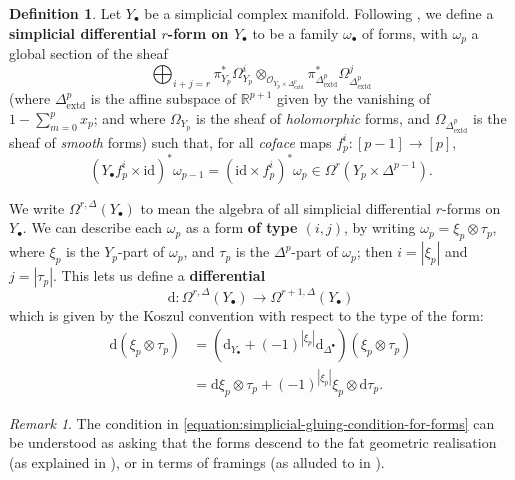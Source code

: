 \documentclass[11pt,fleqn]{article}
\theoremstyle{plain}
\theoremstyle{definition}
\newtheorem{definition}[theorem]{Definition}
\theoremstyle{remark}
\newtheorem{remark}[theorem]{Remark}
\numberwithin{equation}{theorem}
\newcommand{\OO}{\mathcal{O}}
\newcommand{\id}{\mathrm{id}}
\newcommand{\define}[1]{\textbf{#1}}
\renewcommand{\d}{\mathrm{d}}
\begin{document}
        \begin{definition}
            Let $Y_\bullet$ be a simplicial complex manifold.
            Following \cite{Dupont1976}, we define a \define{simplicial differential $r$-form on $Y_{\bullet}$} to be a family $\omega_\bullet$ of forms, with $\omega_p$ a global section of the sheaf
            \[
                \bigoplus_{i+j=r}
                    \pi_{Y_p}^* \Omega_{Y_p}^i
                    \otimes_{\OO_{Y_p\times \Delta^p_\mathrm{extd}}}
                    \pi_{\Delta^p_\mathrm{extd}}^* \Omega_{\Delta^p_\mathrm{extd}}^j
            \]
            (where $\Delta^p_\mathrm{extd}$ is the affine subspace of $\mathbb{R}^{p+1}$ given by the vanishing of $1-\sum_{m=0}^p x_p$; and where $\Omega_{Y_p}$ is the sheaf of \emph{holomorphic} forms, and $\Omega_{\Delta^p_\mathrm{extd}}$ is the sheaf of \emph{smooth} forms) such that, for all \emph{coface} maps $f_p^i\colon[p-1]\to[p]$,
            \begin{equation}
            \label{equation:simplicial-gluing-condition-for-forms}
                \left(Y_\bullet f_p^i\times\id\right)^*\omega_{p-1}
                = \left(\id\times f_p^i\right)^*\omega_p
                \in \Omega^r(Y_{p}\times\Delta^{p-1}).
            \end{equation}

            We write $\Omega^{r,\Delta}(Y_\bullet)$ to mean the algebra of all simplicial differential $r$-forms on $Y_\bullet$.
            We can describe each $\omega_p$ as a form \define{of type $(i,j)$}, by writing $\omega_p = \xi_p\otimes\tau_p$, where $\xi_p$ is the $Y_p$-part of $\omega_p$, and $\tau_p$ is the $\Delta^p$-part of $\omega_p$; then $i=|\xi_p|$ and $j=|\tau_p|$.
            This lets us define a \define{differential}
            \[
                \d \colon \Omega^{r,\Delta}(Y_\bullet) \longrightarrow \Omega^{r+1,\Delta}(Y_\bullet)
            \]
            which is given by the Koszul convention with respect to the type of the form:
            \begin{align*}
                \d(\xi_p\otimes\tau_p)
                &= \left(\d_{Y_\bullet} + (-1)^{|\xi_p|}\d_{\Delta^\bullet}\right) (\xi_p\otimes\tau_p)
            \\  &= \d\xi_p\otimes\tau_p + (-1)^{|\xi_p|}\xi_p\otimes\d\tau_p.
            \end{align*}
        \end{definition}

        \begin{remark}
            The condition in \cref{equation:simplicial-gluing-condition-for-forms} can be understood as asking that the forms descend to the fat geometric realisation (as explained in \cite{Dupont1976}), or in terms of framings (as alluded to in \cite{Hosgood2020}).
        \end{remark}
\end{document}
